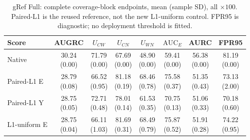 \begin{table}[t]
\centering\footnotesize
\setlength{\tabcolsep}{3pt}
\renewcommand{\arraystretch}{1.15}
\caption{gRef Full: complete coverage-block endpoints, mean (sample SD), all $\times100$. Paired-L1 is the reused reference, not the new L1-uniform control. FPR95 is diagnostic; no deployment threshold is fitted.}\label{tab:coverage_endpoints_gref_full}
\begin{tabular}{@{}lccccccc@{}}\toprule
Score & AUGRC & $U_{CW}$ & $U_{CN}$ & $U_{WN}$ & $\mathrm{AUC}_E$ & AURC & FPR95\\\midrule
Native & \shortstack{30.24\\{\scriptsize (0.00)}} & \shortstack{71.79\\{\scriptsize (0.00)}} & \shortstack{67.69\\{\scriptsize (0.00)}} & \shortstack{48.90\\{\scriptsize (0.00)}} & \shortstack{59.41\\{\scriptsize (0.00)}} & \shortstack{56.38\\{\scriptsize (0.00)}} & \shortstack{81.19\\{\scriptsize (0.00)}}\\
Paired-L1 E & \shortstack{28.79\\{\scriptsize (0.08)}} & \shortstack{66.52\\{\scriptsize (0.95)}} & \shortstack{81.18\\{\scriptsize (0.19)}} & \shortstack{68.46\\{\scriptsize (0.78)}} & \shortstack{75.58\\{\scriptsize (0.37)}} & \shortstack{51.35\\{\scriptsize (0.43)}} & \shortstack{73.13\\{\scriptsize (2.00)}}\\
Paired-L1 Y & \shortstack{28.75\\{\scriptsize (0.05)}} & \shortstack{72.71\\{\scriptsize (0.48)}} & \shortstack{78.01\\{\scriptsize (0.14)}} & \shortstack{61.53\\{\scriptsize (0.35)}} & \shortstack{70.75\\{\scriptsize (0.13)}} & \shortstack{51.06\\{\scriptsize (0.33)}} & \shortstack{70.18\\{\scriptsize (0.60)}}\\
L1-uniform E & \shortstack{28.75\\{\scriptsize (0.04)}} & \shortstack{66.11\\{\scriptsize (1.03)}} & \shortstack{81.69\\{\scriptsize (0.31)}} & \shortstack{68.49\\{\scriptsize (0.79)}} & \shortstack{75.87\\{\scriptsize (0.52)}} & \shortstack{51.91\\{\scriptsize (0.28)}} & \shortstack{74.22\\{\scriptsize (0.95)}}\\

\end{tabular}
\end{table}
